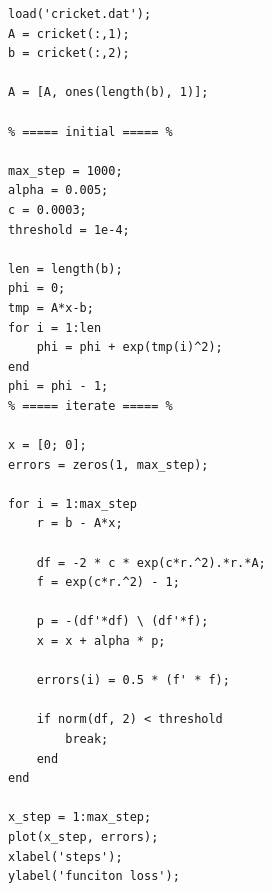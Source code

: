 \documentclass[a4paper, 11pt]{article}
\begin{document}
\lstset{
	language=Octave,
	xleftmargin=3em,
	}
\begin{lstlisting}
load('cricket.dat');
A = cricket(:,1);
b = cricket(:,2);

A = [A, ones(length(b), 1)];

% ===== initial ===== %

max_step = 1000;
alpha = 0.005;
c = 0.0003;
threshold = 1e-4;

len = length(b);
phi = 0;
tmp = A*x-b;
for i = 1:len
	phi = phi + exp(tmp(i)^2);
end
phi = phi - 1;
% ===== iterate ===== %

x = [0; 0];
errors = zeros(1, max_step);

for i = 1:max_step
	r = b - A*x;

	df = -2 * c * exp(c*r.^2).*r.*A;
	f = exp(c*r.^2) - 1;

	p = -(df'*df) \ (df'*f);
	x = x + alpha * p;

	errors(i) = 0.5 * (f' * f);

	if norm(df, 2) < threshold
		break;
	end
end

x_step = 1:max_step;
plot(x_step, errors);
xlabel('steps');
ylabel('funciton loss');

\end{lstlisting}
\end{document}
